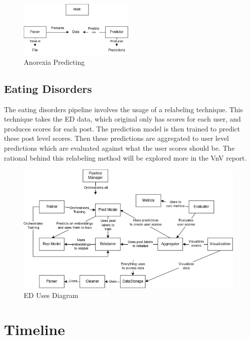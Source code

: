\documentclass[12pt, titlepage]{article}
\begin{document}
\begin{figure}[H]
\centering
\includegraphics[width=0.5\textwidth]{task2-test.png}
\caption{Anorexia Predicting}
\label{FigT2Tes}
\end{figure}

\subsection{Eating Disorders}

The eating disorders pipeline involves the usage of a relabeling technique. This technique takes the ED data, which original only has scores for each user, and produces scores for each post. The prediction model is then trained to predict these post level scores. Then these predictions are aggregated to user level predictions which are evaluated against what the user scores should be. The rational behind this relabeling method will be explored more in the VnV report.

\begin{figure}[H]
\centering
\includegraphics[width=1\textwidth]{ED-uses-diagram.png}
\caption{ED Uses Diagram}
\label{FigT3Uses}
\end{figure}

\section{Timeline}
\end{document}
